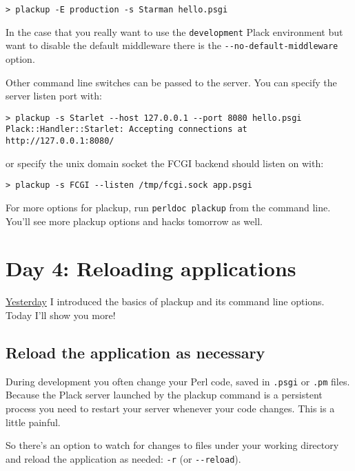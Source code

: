 \begin{lstlisting}
> plackup -E production -s Starman hello.psgi
\end{lstlisting}

In the case that you really want to use the \lstinline!development!
Plack environment but want to disable the default middleware there is
the \lstinline!--no-default-middleware! option.

Other command line switches can be passed to the server. You can specify
the server listen port with:

\begin{lstlisting}
> plackup -s Starlet --host 127.0.0.1 --port 8080 hello.psgi
Plack::Handler::Starlet: Accepting connections at http://127.0.0.1:8080/
\end{lstlisting}

or specify the unix domain socket the FCGI backend should listen on
with:

\begin{lstlisting}
> plackup -s FCGI --listen /tmp/fcgi.sock app.psgi
\end{lstlisting}

For more options for plackup, run \lstinline!perldoc plackup! from the
command line. You'll see more plackup options and hacks tomorrow as
well.

\chapter{Day 4: Reloading
applications}\label{day-4-reloading-applications}

\href{http://advent.plackperl.org/2009/12/day-3-using-plackup.html}{Yesterday}
I introduced the basics of plackup and its command line options. Today
I'll show you more!

\section{Reload the application as
necessary}\label{reload-the-application-as-necessary}

During development you often change your Perl code, saved in
\lstinline!.psgi! or \lstinline!.pm! files. Because the Plack server
launched by the plackup command is a persistent process you need to
restart your server whenever your code changes. This is a little
painful.

So there's an option to watch for changes to files under your working
directory and reload the application as needed: \lstinline!-r! (or
\lstinline!--reload!).

